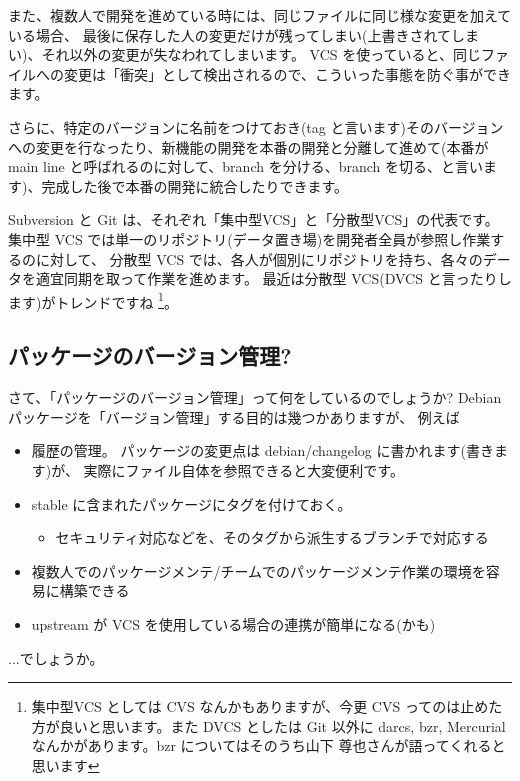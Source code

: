 \documentclass[mingoth,a4paper]{jsarticle}
\begin{document}
また、複数人で開発を進めている時には、同じファイルに同じ様な変更を加えている場合、
最後に保存した人の変更だけが残ってしまい(上書きされてしまい)、それ以外の変更が失なわれてしまいます。
VCS を使っていると、同じファイルへの変更は「衝突」として検出されるので、こういった事態を防ぐ事ができます。

さらに、特定のバージョンに名前をつけておき(tag と言います)そのバージョンへの変更を行なったり、新機能の開発を本番の開発と分離して進めて(本番が main line と呼ばれるのに対して、branch を分ける、branch を切る、と言います)、完成した後で本番の開発に統合したりできます。

Subversion と Git は、それぞれ「集中型VCS」と「分散型VCS」の代表です。
集中型 VCS では単一のリポジトリ(データ置き場)を開発者全員が参照し作業するのに対して、
分散型 VCS では、各人が個別にリポジトリを持ち、各々のデータを適宜同期を取って作業を進めます。
最近は分散型 VCS(DVCS と言ったりします)がトレンドですね%
\footnote{集中型VCS としては CVS なんかもありますが、今更 CVS ってのは止めた方が良いと思います。また DVCS としたは Git 以外に darcs, bzr, Mercurial なんかがあります。bzr についてはそのうち山下 尊也さんが語ってくれると思います}。

\subsection{パッケージのバージョン管理?}

さて、「パッケージのバージョン管理」って何をしているのでしょうか?
Debian パッケージを「バージョン管理」する目的は幾つかありますが、
例えば
\begin{itemize}
\item 履歴の管理。
  パッケージの変更点は debian/changelog に書かれます(書きます)が、
  実際にファイル自体を参照できると大変便利です。
\item stable に含まれたパッケージにタグを付けておく。
  \begin{itemize}
  \item セキュリティ対応などを、そのタグから派生するブランチで対応する
  \end{itemize}
\item 複数人でのパッケージメンテ/チームでのパッケージメンテ作業の環境を容易に構築できる
\item upstream が VCS を使用している場合の連携が簡単になる(かも)
\end{itemize}
...でしょうか。
\end{document}
